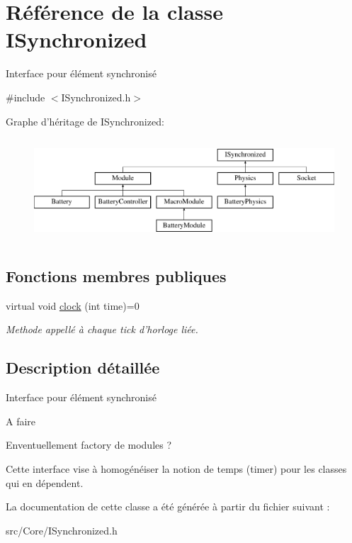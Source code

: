 \hypertarget{classISynchronized}{\section{Référence de la classe I\-Synchronized}
\label{classISynchronized}
}


Interface pour élément synchronisé  




{\ttfamily \#include $<$I\-Synchronized.\-h$>$}

Graphe d'héritage de I\-Synchronized\-:\begin{figure}[H]
\begin{center}
\leavevmode
\includegraphics[height=3.862069cm]{classISynchronized}
\end{center}
\end{figure}
\subsection*{Fonctions membres publiques}
\begin{DoxyCompactItemize}
\item 
\hypertarget{classISynchronized_af7155c662758d6c70f381bb9b11afcd6}{virtual void \hyperlink{classISynchronized_af7155c662758d6c70f381bb9b11afcd6}{clock} (int time)=0}\label{classISynchronized_af7155c662758d6c70f381bb9b11afcd6}

\begin{DoxyCompactList}\small\item\em Methode appellé à chaque tick d'horloge liée. \end{DoxyCompactList}\end{DoxyCompactItemize}


\subsection{Description détaillée}
Interface pour élément synchronisé 

\begin{DoxyRefDesc}{A faire}
\item[\hyperlink{todo__todo000004}{A faire}]Enventuellement factory de modules ? \end{DoxyRefDesc}


Cette interface vise à homogénéiser la notion de temps (timer) pour les classes qui en dépendent. 

La documentation de cette classe a été générée à partir du fichier suivant \-:\begin{DoxyCompactItemize}
\item 
src/\-Core/I\-Synchronized.\-h\end{DoxyCompactItemize}

